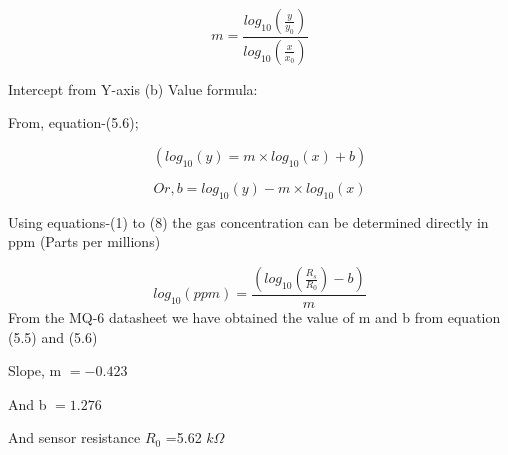 \begin{equation}\tag{5.5}
m=\frac{log_{10} \left( \frac{y}{y_{0}} \right) }{log_{10} \left( \frac{x}{x_{0}} \right) }
\end{equation}
\begin{justify}
Intercept from Y-axis (b) Value formula:
\end{justify}\par

\begin{justify}
From, equation-(5.6);
\end{justify}\par

\begin{equation*}
 ( log_{10} \left( y \right) =m \times log_{10} \left( x \right) +b)
\end{equation*}


\begin{equation}\tag{5.6}
Or, b=log_{10} \left( y \right) -m \times log_{10} \left( x \right)
\end{equation}
\begin{justify}
Using equations-(1) to (8) the gas concentration can be\textbf{ }determined directly in ppm (Parts per millions)
\end{justify}\par


\begin{equation}\tag{5.7}
log_{10} \left( ppm \right) =\frac{ \left( log_{10} \left( \frac{R_{s}}{R_{0}} \right) -b \right) }{m}
\end{equation}
From the MQ-6 datasheet we have obtained the value of m and b from equation (5.5) and (5.6)\par

\setlength{\parskip}{0.0pt}
Slope, m  \( = -0.423 \) \  \par

And b  \( =1.276 \)  \par

And sensor resistance  \( R_{0} \) =5.62  \( k \Omega  \) \par


\vspace{\baselineskip}
\setlength{\parskip}{8.04pt}
\par


\vspace{\baselineskip}
\setlength{\parskip}{0.0pt}





